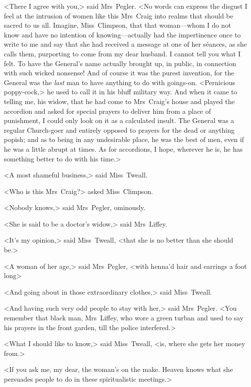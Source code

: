 <There I agree with you,> said Mrs~Pegler. <No words can express the disgust I feel at the intrusion of women like this Mrs~Craig into realms that should be sacred to us all. Imagine, Miss~Climpson, that that woman—whom I do not know and have no intention of knowing—actually had the impertinence once to write to me and say that she had received a message at one of her séances, as she calls them, purporting to come from my dear husband. I cannot tell you what I felt. To have the General's name actually brought up, in public, in connection with such wicked nonsense! And of course it was the purest invention, for the General was the \emph{last} man to have anything to do with goings-on. <Pernicious poppy-cock,> he used to call it in his bluff military way. And when it came to telling me, his widow, that he had come to Mrs~Craig's house and played the accordion and asked for special prayers to deliver him from a place of punishment, I could only look on it as a calculated insult. The General was a regular Church-goer and entirely opposed to prayers for the dead or anything popish; and as to being in any undesirable place, he was the best of men, even if he was a little abrupt at times. As for accordions, I hope, wherever he is, he has something better to do with his time.>

<A most shameful business,> said Miss~Tweall.

<Who is this Mrs~Craig?> asked Miss~Climpson.

<Nobody knows,> said Mrs~Pegler, ominously.

<She is said to be a doctor's widow,> said Mrs~Liffey.

<It's my opinion,> said Miss~Tweall, <that she is no better than she should be.>

<A woman of her age,> said Mrs~Pegler, <with henna'd hair and earrings a foot long\longdash>

<And going about in those extraordinary clothes,> said Miss~Tweall.

<And having such very odd people to stay with her,> said Mrs~Pegler. <You remember that black man, Mrs~Liffey, who wore a green turban and used to say his prayers in the front garden, till the police interfered.>

<What I should like to know,> said Miss~Tweall, <is, where she gets her money from.>

<If you ask me, my dear, the woman's on the make. Heaven knows what she persuades people to do in these spiritualistic meetings.>

